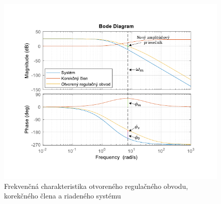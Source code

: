 \documentclass[a4paper,10pt]{article}
\begin{document}
\begin{figure}[ht]
\centering
\includegraphics[width=1.0\textwidth]{OROBode}
\caption{Frekvenčná charakteristika otvoreného regulačného obvodu, korekčného člena a riadeného systému}
\end{figure}
\end{document}
